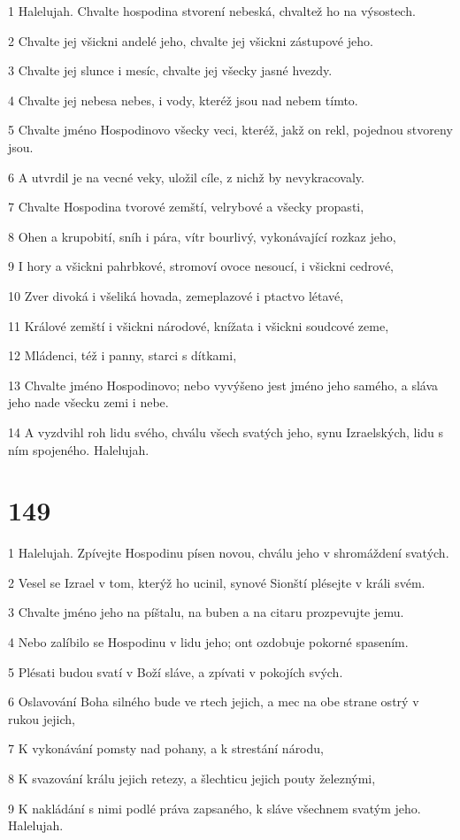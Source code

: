 \par 1 Halelujah. Chvalte hospodina stvorení nebeská, chvaltež ho na výsostech.
\par 2 Chvalte jej všickni andelé jeho, chvalte jej všickni zástupové jeho.
\par 3 Chvalte jej slunce i mesíc, chvalte jej všecky jasné hvezdy.
\par 4 Chvalte jej nebesa nebes, i vody, kteréž jsou nad nebem tímto.
\par 5 Chvalte jméno Hospodinovo všecky veci, kteréž, jakž on rekl, pojednou stvoreny jsou.
\par 6 A utvrdil je na vecné veky, uložil cíle, z nichž by nevykracovaly.
\par 7 Chvalte Hospodina tvorové zemští, velrybové a všecky propasti,
\par 8 Ohen a krupobití, sníh i pára, vítr bourlivý, vykonávající rozkaz jeho,
\par 9 I hory a všickni pahrbkové, stromoví ovoce nesoucí, i všickni cedrové,
\par 10 Zver divoká i všeliká hovada, zemeplazové i ptactvo létavé,
\par 11 Králové zemští i všickni národové, knížata i všickni soudcové zeme,
\par 12 Mládenci, též i panny, starci s dítkami,
\par 13 Chvalte jméno Hospodinovo; nebo vyvýšeno jest jméno jeho samého, a sláva jeho nade všecku zemi i nebe.
\par 14 A vyzdvihl roh lidu svého, chválu všech svatých jeho, synu Izraelských, lidu s ním spojeného. Halelujah.

\chapter{149}

\par 1 Halelujah. Zpívejte Hospodinu písen novou, chválu jeho v shromáždení svatých.
\par 2 Vesel se Izrael v tom, kterýž ho ucinil, synové Sionští plésejte v králi svém.
\par 3 Chvalte jméno jeho na píštalu, na buben a na citaru prozpevujte jemu.
\par 4 Nebo zalíbilo se Hospodinu v lidu jeho; ont ozdobuje pokorné spasením.
\par 5 Plésati budou svatí v Boží sláve, a zpívati v pokojích svých.
\par 6 Oslavování Boha silného bude ve rtech jejich, a mec na obe strane ostrý v rukou jejich,
\par 7 K vykonávání pomsty nad pohany, a k strestání národu,
\par 8 K svazování králu jejich retezy, a šlechticu jejich pouty železnými,
\par 9 K nakládání s nimi podlé práva zapsaného, k sláve všechnem svatým jeho. Halelujah.

